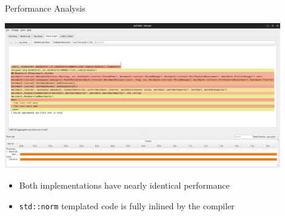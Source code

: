 \documentclass{beamer}
\begin{document}
\begin{frame}{Performance Analysis}
    \begin{center}
        \includegraphics[width=0.9\textwidth]{images/V3_perf.png}
    \end{center}
    \begin{itemize}
        \item Both implementations have nearly identical performance
        \item \texttt{std::norm} templated code is fully inlined by the compiler
    \end{itemize}
\end{frame}
\end{document}
